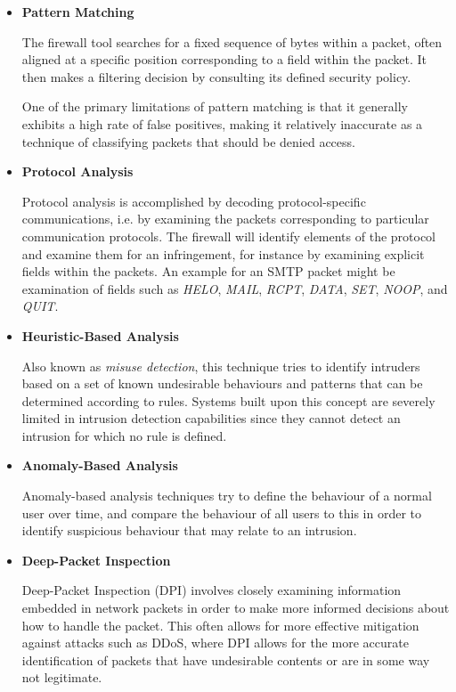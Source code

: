 \begin{itemize}
\item \textbf{Pattern Matching}

The firewall tool searches for a fixed sequence of bytes within a packet, often aligned at a specific position corresponding to a field within the packet. It then makes a filtering decision by consulting its defined security policy.

One of the primary limitations of pattern matching is that it generally exhibits a high rate of false positives, making it relatively inaccurate as a technique of classifying packets that should be denied access. 
\item \textbf{Protocol Analysis}

Protocol analysis is accomplished by decoding protocol-specific communications, i.e. by examining the packets corresponding to particular communication protocols. The firewall will identify elements of the protocol and examine them for an infringement, for instance by examining explicit fields within the packets. An example for an SMTP packet might be examination of fields such as \textit{HELO}, \textit{MAIL}, \textit{RCPT}, \textit{DATA}, \textit{SET}, \textit{NOOP}, and \textit{QUIT}.
\item \textbf{Heuristic-Based Analysis}

Also known as \textit{misuse detection}, this technique tries to identify intruders based on a set of known undesirable behaviours and patterns that can be determined according to rules. Systems built upon this concept are severely limited in intrusion detection capabilities since they cannot detect an intrusion for which no rule is defined. 

\item \textbf{Anomaly-Based Analysis}

Anomaly-based analysis techniques try to define the behaviour of a normal user over time, and compare the behaviour of all users to this in order to identify suspicious behaviour that may relate to an intrusion. 

\item \textbf{Deep-Packet Inspection}
 
Deep-Packet Inspection (DPI) involves closely examining information embedded in network packets in order to make more informed decisions about how to handle the packet. This often allows for more effective mitigation against attacks such as DDoS, where DPI allows for the more accurate identification of packets that have undesirable contents or are in some way not legitimate.

\end{itemize}


